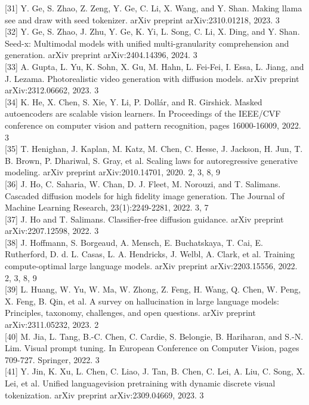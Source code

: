 \documentclass{article}
\begin{document}
[31] Y. Ge, S. Zhao, Z. Zeng, Y. Ge, C. Li, X. Wang, and Y. Shan. Making llama see and draw with seed tokenizer. arXiv preprint arXiv:2310.01218, 2023. 3\\[0pt]
[32] Y. Ge, S. Zhao, J. Zhu, Y. Ge, K. Yi, L. Song, C. Li, X. Ding, and Y. Shan. Seed-x: Multimodal models with unified multi-granularity comprehension and generation. arXiv preprint arXiv:2404.14396, 2024. 3\\[0pt]
[33] A. Gupta, L. Yu, K. Sohn, X. Gu, M. Hahn, L. Fei-Fei, I. Essa, L. Jiang, and J. Lezama. Photorealistic video generation with diffusion models. arXiv preprint arXiv:2312.06662, 2023. 3\\[0pt]
[34] K. He, X. Chen, S. Xie, Y. Li, P. Dollár, and R. Girshick. Masked autoencoders are scalable vision learners. In Proceedings of the IEEE/CVF conference on computer vision and pattern recognition, pages 16000-16009, 2022. 3\\[0pt]
[35] T. Henighan, J. Kaplan, M. Katz, M. Chen, C. Hesse, J. Jackson, H. Jun, T. B. Brown, P. Dhariwal, S. Gray, et al. Scaling laws for autoregressive generative modeling. arXiv preprint arXiv:2010.14701, 2020. 2, 3, 8, 9\\[0pt]
[36] J. Ho, C. Saharia, W. Chan, D. J. Fleet, M. Norouzi, and T. Salimans. Cascaded diffusion models for high fidelity image generation. The Journal of Machine Learning Research, 23(1):2249-2281, 2022. 3, 7\\[0pt]
[37] J. Ho and T. Salimans. Classifier-free diffusion guidance. arXiv preprint arXiv:2207.12598, 2022. 3\\[0pt]
[38] J. Hoffmann, S. Borgeaud, A. Mensch, E. Buchatskaya, T. Cai, E. Rutherford, D. d. L. Casas, L. A. Hendricks, J. Welbl, A. Clark, et al. Training compute-optimal large language models. arXiv preprint arXiv:2203.15556, 2022. 2, 3, 8, 9\\[0pt]
[39] L. Huang, W. Yu, W. Ma, W. Zhong, Z. Feng, H. Wang, Q. Chen, W. Peng, X. Feng, B. Qin, et al. A survey on hallucination in large language models: Principles, taxonomy, challenges, and open questions. arXiv preprint arXiv:2311.05232, 2023. 2\\[0pt]
[40] M. Jia, L. Tang, B.-C. Chen, C. Cardie, S. Belongie, B. Hariharan, and S.-N. Lim. Visual prompt tuning. In European Conference on Computer Vision, pages 709-727. Springer, 2022. 3\\[0pt]
[41] Y. Jin, K. Xu, L. Chen, C. Liao, J. Tan, B. Chen, C. Lei, A. Liu, C. Song, X. Lei, et al. Unified languagevision pretraining with dynamic discrete visual tokenization. arXiv preprint arXiv:2309.04669, 2023. 3\\[0pt]
\end{document}
